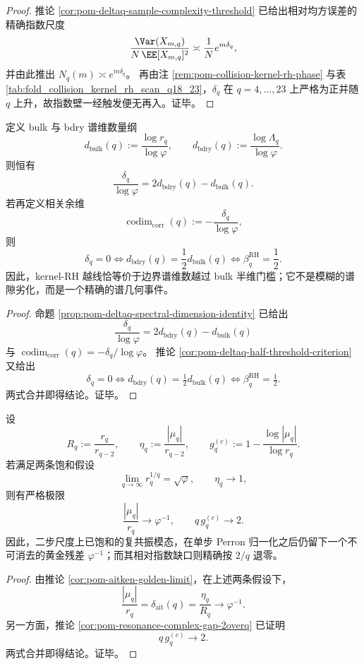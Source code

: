 \begin{proof}
推论 \ref{cor:pom-deltaq-sample-complexity-threshold} 已给出相对均方误差的精确指数尺度
\[
\frac{\Var(X_{m,q})}{N\,\EE[X_{m,q}]^2}\asymp \frac{1}{N}e^{m\delta_q},
\]
并由此推出 \(N_q(m)\asymp e^{m\delta_q}\)。
再由注 \ref{rem:pom-collision-kernel-rh-phase} 与表 \ref{tab:fold_collision_kernel_rh_scan_q18_23}，\(\delta_q\) 在 \(q=4,\dots,23\) 上严格为正并随 \(q\) 上升，故指数壁一经触发便无再入。证毕。
\end{proof}

\begin{theorem}[越线指数的谱几何余维恒等式]\label{thm:conclusion-kernel-rh-codimension-identity}
定义 bulk 与 bdry 谱维数量纲
\[
d_{\mathrm{bulk}}(q):=\frac{\log r_q}{\log\varphi},
\qquad
d_{\mathrm{bdry}}(q):=\frac{\log\Lambda_q}{\log\varphi}.
\]
则恒有
\[
\frac{\delta_q}{\log\varphi}=2d_{\mathrm{bdry}}(q)-d_{\mathrm{bulk}}(q).
\]
若再定义相关余维
\[
\operatorname{codim}_{\mathrm{corr}}(q):=-\frac{\delta_q}{\log\varphi},
\]
则
\[
\delta_q=0
\iff
d_{\mathrm{bdry}}(q)=\frac12 d_{\mathrm{bulk}}(q)
\iff
\beta_q^{\mathrm{RH}}=\frac12.
\]
因此，kernel-RH 越线恰等价于边界谱维数越过 bulk 半维门槛；它不是模糊的谱隙劣化，而是一个精确的谱几何事件。
\end{theorem}

\begin{proof}
命题 \ref{prop:pom-deltaq-spectral-dimension-identity} 已给出
\[
\frac{\delta_q}{\log\varphi}=2d_{\mathrm{bdry}}(q)-d_{\mathrm{bulk}}(q)
\]
与
\(
\operatorname{codim}_{\mathrm{corr}}(q)=-\delta_q/\log\varphi
\)。
推论 \ref{cor:pom-deltaq-half-threshold-criterion} 又给出
\[
\delta_q=0
\iff
d_{\mathrm{bdry}}(q)=\tfrac12 d_{\mathrm{bulk}}(q)
\iff
\beta_q^{\mathrm{RH}}=\tfrac12.
\]
两式合并即得结论。证毕。
\end{proof}

\begin{theorem}\label{thm:conclusion-kernel-rh-golden-residual-two-step-saturation}
设
\[
R_q:=\frac{r_q}{r_{q-2}},
\qquad
\eta_q:=\frac{|\mu_q|}{r_{q-2}},
\qquad
g_q^{(c)}:=1-\frac{\log|\mu_q|}{\log r_q}.
\]
若满足两条饱和假设
\[
\lim_{q\to\infty}r_q^{1/q}=\sqrt{\varphi},
\qquad
\eta_q\longrightarrow 1,
\]
则有严格极限
\[
\frac{|\mu_q|}{r_q}\longrightarrow \varphi^{-1},
\qquad
q\,g_q^{(c)}\longrightarrow 2.
\]
因此，二步尺度上已饱和的复共振模态，在单步 Perron 归一化之后仍留下一个不可消去的黄金残差 \(\varphi^{-1}\)；而其相对指数缺口则精确按 \(2/q\) 退零。
\end{theorem}

\begin{proof}
由推论 \ref{cor:pom-aitken-golden-limit}，在上述两条假设下，
\[
\frac{|\mu_q|}{r_q}
=
\delta_{\mathrm{ait}}(q)
=
\frac{\eta_q}{R_q}
\longrightarrow \varphi^{-1}.
\]
另一方面，推论 \ref{cor:pom-resonance-complex-gap-2overq} 已证明
\[
q\,g_q^{(c)}\longrightarrow 2.
\]
两式合并即得结论。证毕。
\end{proof}
